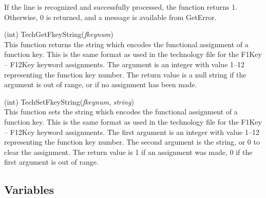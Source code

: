 \begin{description}
If the line is recognized and successfully processed, the function
returns 1.  Otherwise, 0 is returned, and a message is available from
{\vt GetError}.

\item{(int) \vt TechGetFkeyString({\it fkeynum})}\\
This function returns the string which encodes the functional
assignment of a function key.  This is the same format as used in the
technology file for the F1Key -- F12Key keyword assignments.  The
argument is an integer with value 1--12 representing the function key
number.  The return value is a null string if the argument is out of
range, or if no assignment has been made.

\item{(int) \vt TechSetFkeyString({\it fkeynum}, {\it string\/})}\\
This function sets the string which encodes the functional assignment
of a function key.  This is the same format as used in the technology
file for the F1Key -- F12Key keyword assignments.  The first argument
is an integer with value 1--12 representing the function key number. 
The second argument is the string, or 0 to clear the assignment.  The
return value is 1 if an assignment was made, 0 if the first argument
is out of range.
\end{description}


\subsection{Variables}

